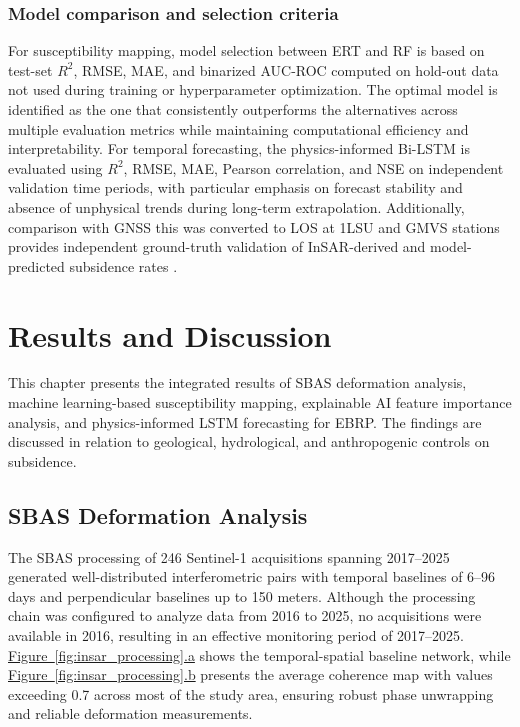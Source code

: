 \documentclass[oneside,doublespacing,flushright]{lsuthesis}
\newcommand{\figref}[2]{\hyperref[#1]{Figure~\ref*{#1}.#2}}
\begin{document}
\subsection{Model comparison and selection criteria}
For susceptibility mapping, model selection between ERT and RF is based on test-set $R^2$, RMSE, MAE, and binarized AUC-ROC computed on hold-out data not used during training or hyperparameter optimization. 
The optimal model is identified as the one that consistently outperforms the alternatives across multiple evaluation metrics while maintaining computational efficiency and interpretability. For temporal forecasting, 
the physics-informed Bi-LSTM is evaluated using $R^2$, 
RMSE, MAE, Pearson correlation, and NSE on independent validation time periods, with particular emphasis on forecast stability and absence of unphysical trends during long-term extrapolation. Additionally, comparison with GNSS 
this was converted to LOS at 1LSU and GMVS stations provides independent ground-truth validation of InSAR-derived and model-predicted subsidence rates \citep{Abdalla2024}.

\clearpage
\chapter{Results and Discussion}

This chapter presents the integrated results of SBAS deformation analysis, machine learning-based susceptibility mapping, explainable AI feature importance analysis, and physics-informed LSTM forecasting for EBRP. The findings are discussed in relation to geological, hydrological, and anthropogenic controls on subsidence.

\section{SBAS Deformation Analysis}
The SBAS processing of 246 Sentinel-1 acquisitions spanning 2017--2025 generated well-distributed interferometric pairs with 
temporal baselines of 6--96 days and perpendicular baselines up to 150 meters. Although the processing chain was configured to 
analyze data from 2016 to 2025, no acquisitions were available in 2016, resulting in an effective monitoring period of 2017--2025. 
\figref{fig:insar_processing}{a} shows the temporal-spatial baseline network, while \figref{fig:insar_processing}{b} presents the 
average coherence map with values exceeding 0.7 across most of the study area, ensuring robust phase unwrapping and reliable 
deformation measurements.
\end{document}
